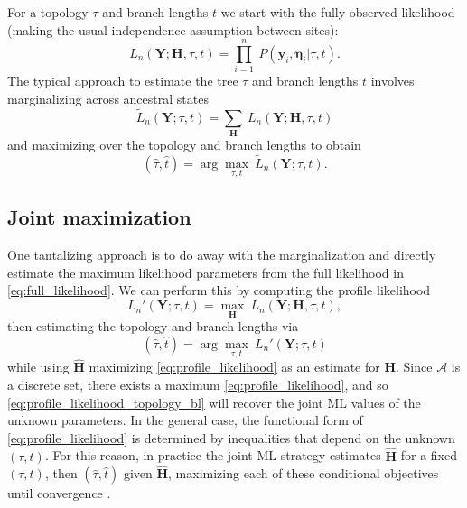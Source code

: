 \documentclass[a4paper]{article}
\newcommand{\alphabet}{\mathcal{A}}
\newcommand{\fullAlignment}{\mathbf{Y}}
\newcommand{\alignmentColumn}{\mathbf{y}}
\newcommand{\fullAncestralStates}{\mathbf{H}}
\newcommand{\ancestralStateColumn}{\boldsymbol\eta}
\newcommand{\nCols}{n}
\begin{document}
For a topology $\tau$ and branch lengths $t$ we start with the fully-observed likelihood (making the usual independence assumption between sites):
\begin{equation}
\label{eq:full_likelihood}
L_\nCols(\fullAlignment;\fullAncestralStates, \tau, t) = \prod_{i=1}^{\nCols} \ P(\alignmentColumn_i, \ancestralStateColumn_i | \tau, t).
\end{equation}
The typical approach to estimate the tree $\tau$ and branch lengths $t$ involves marginalizing across ancestral states
\begin{equation}
\label{eq:marginal_likelihood}
\tilde{L}_\nCols(\fullAlignment; \tau, t) = \sum_{\fullAncestralStates} \ L_\nCols(\fullAlignment;\fullAncestralStates, \tau, t)
\end{equation}
and maximizing over the topology and branch lengths to obtain
$$
(\hat{\tau}, \hat{t}) = \arg\max_{\tau, t} \  \tilde{L}_\nCols(\fullAlignment; \tau, t).
$$

\subsection{Joint maximization}

One tantalizing approach is to do away with the marginalization and directly estimate the maximum likelihood parameters from the full likelihood in \eqref{eq:full_likelihood}.
We can perform this by computing the profile likelihood
\begin{equation}
\label{eq:profile_likelihood}
L_\nCols'(\fullAlignment;\tau, t) = \max_{\fullAncestralStates} \ L_\nCols(\fullAlignment;\fullAncestralStates, \tau, t),
\end{equation}
then estimating the topology and branch lengths via
\begin{equation}
\label{eq:profile_likelihood_topology_bl}
(\hat{\tau}, \hat{t}) = \arg\max_{\tau, t} \ L_\nCols'(\fullAlignment;\tau, t)
\end{equation}
while using $\hat{\fullAncestralStates}$ maximizing \eqref{eq:profile_likelihood} as an estimate for $\fullAncestralStates$.
Since $\alphabet$ is a discrete set, there exists a maximum \eqref{eq:profile_likelihood}, and so \eqref{eq:profile_likelihood_topology_bl} will recover the joint ML values of the unknown parameters.
In the general case, the functional form of \eqref{eq:profile_likelihood} is determined by inequalities that depend on the unknown $(\tau,t)$.
For this reason, in practice the joint ML strategy estimates $\hat{\fullAncestralStates}$ for a fixed $(\tau,t)$, then $(\hat{\tau},\hat{t})$ given $\hat{\fullAncestralStates}$, maximizing each of these conditional objectives until convergence \cite{Neher2017}.
\end{document}
